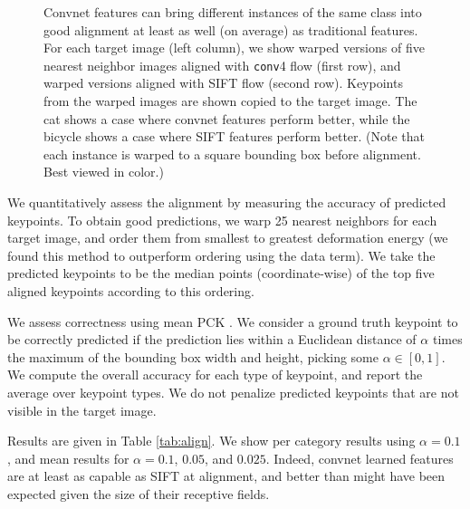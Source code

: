 \documentclass{article} \usepackage{nips14submit_e,times}
\newcommand{\trevor}[1]{}
\begin{document}
\begin{figure}[t]
{\begin{tabular}{crccccc}
\end{tabular}
}
\caption{
Convnet features can bring different instances of the same class into good
alignment at least as well (on average) as traditional features.
For each target image (left column), we show warped versions of five nearest
neighbor images aligned with \texttt{conv}4 flow (first row), and warped
versions aligned with SIFT flow \cite{sift-flow} (second row).
Keypoints from the warped images are shown copied to the target image.
The cat shows a case where convnet features perform better, while the bicycle shows
a case where SIFT features perform better.
(Note that each instance is warped to a square bounding box before alignment.
Best viewed in color.)
\trevor{Mention flipping? or flip in figure? Otherwise the second on looks like an error.}}
\label{fig:align}
\end{figure}

We quantitatively assess the alignment by measuring the accuracy of predicted
keypoints. To obtain good predictions, we warp 25 nearest neighbors for each
target image, and order them from smallest to greatest deformation energy
(we
found this method to outperform ordering using the data term).
We take the predicted keypoints to be the median points (coordinate-wise) of the
top five aligned keypoints according to this ordering.

We assess correctness using mean PCK \cite{PCP}.
We consider a ground truth keypoint to be correctly predicted if the prediction
lies within a Euclidean distance of $\alpha$ times the maximum of the
bounding box width and height, picking some $\alpha \in [0, 1]$.
We compute the overall accuracy for each type of keypoint,
and report the average over keypoint types.
We do not penalize predicted keypoints that are not visible
in the target image.

Results are given in Table \ref{tab:align}. We show per category results using
$\alpha = 0.1$, and mean results for $\alpha = 0.1$, $0.05$, and $0.025$. 
Indeed, convnet learned features are at least as capable as SIFT at
alignment, and better than might have been expected 
given the size of their receptive fields.
\end{document}
